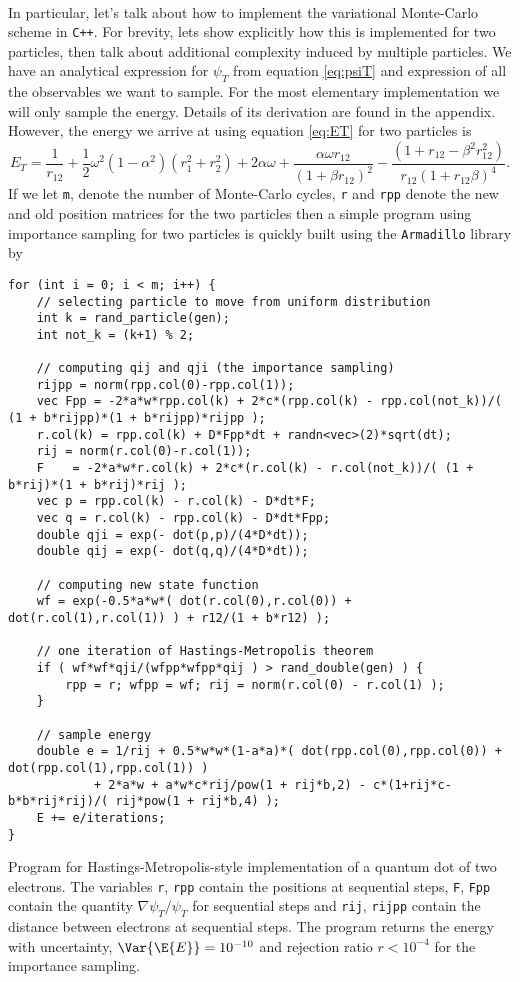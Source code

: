 \documentclass[11pt,english,a4paper]{article}
\begin{document}
\\
In particular, let's talk about how to implement the variational Monte-Carlo scheme in \texttt{C++}. For brevity, lets show explicitly how this is implemented for two particles, then talk about additional complexity induced by multiple particles. We have an analytical expression for $\psi_T$ from equation \eqref{eq:psiT} and expression of all the observables we want to sample. For the most elementary implementation we will only sample the energy. Details of its derivation are found in the appendix. However, the energy we arrive at using equation \eqref{eq:ET} for two particles is
\[
E_T = \frac{1}{r_{12}} + \frac{1}{2}\omega^2(1-\alpha^2)( r_1^2 + r_2^2 )
            + 2\alpha\omega + \frac{\alpha\omega r_{12}}{(1 + \beta r_{12})^2} - \frac{(1+r_{12}-\beta^2r_{12}^2)}{ r_{12}(1 + r_{12}\beta)^4 }.
\]
If we let \texttt{m}, denote the number of Monte-Carlo cycles, \texttt{r} and \texttt{rpp} denote the new and old position matrices for the two particles then a simple program using importance sampling for two particles is quickly built using the \texttt{Armadillo} library by\\
\begin{table}
\begin{lstlisting}
for (int i = 0; i < m; i++) {
    // selecting particle to move from uniform distribution
    int k = rand_particle(gen);
    int not_k = (k+1) % 2;
    
    // computing qij and qji (the importance sampling)
    rijpp = norm(rpp.col(0)-rpp.col(1));
    vec Fpp = -2*a*w*rpp.col(k) + 2*c*(rpp.col(k) - rpp.col(not_k))/( (1 + b*rijpp)*(1 + b*rijpp)*rijpp );
    r.col(k) = rpp.col(k) + D*Fpp*dt + randn<vec>(2)*sqrt(dt);
    rij = norm(r.col(0)-r.col(1));
    F    = -2*a*w*r.col(k) + 2*c*(r.col(k) - r.col(not_k))/( (1 + b*rij)*(1 + b*rij)*rij );
    vec p = rpp.col(k) - r.col(k) - D*dt*F; 
    vec q = r.col(k) - rpp.col(k) - D*dt*Fpp;
    double qji = exp(- dot(p,p)/(4*D*dt)); 
    double qij = exp(- dot(q,q)/(4*D*dt));
    
    // computing new state function
    wf = exp(-0.5*a*w*( dot(r.col(0),r.col(0)) + dot(r.col(1),r.col(1)) ) + r12/(1 + b*r12) );
	
    // one iteration of Hastings-Metropolis theorem
    if ( wf*wf*qji/(wfpp*wfpp*qij ) > rand_double(gen) ) {
        rpp = r; wfpp = wf; rij = norm(r.col(0) - r.col(1) );
    }
    
    // sample energy
    double e = 1/rij + 0.5*w*w*(1-a*a)*( dot(rpp.col(0),rpp.col(0)) + dot(rpp.col(1),rpp.col(1)) )
            + 2*a*w + a*w*c*rij/pow(1 + rij*b,2) - c*(1+rij*c-b*b*rij*rij)/( rij*pow(1 + rij*b,4) );
    E += e/iterations;
}
\end{lstlisting}
\caption{Program for Hastings-Metropolis-style implementation of a quantum dot of two electrons. The variables \texttt{r}, \texttt{rpp} contain the positions at sequential steps, \texttt{F}, \texttt{Fpp} contain the quantity $\nabla \psi_T/\psi_T$ for sequential steps and \texttt{rij}, \texttt{rijpp} contain the distance between electrons at sequential steps. The program returns the energy with uncertainty, $\Var{\E{E}} = 10^{-10}$ and rejection ratio $r < 10^{-4}$ for the importance sampling.}
\end{table}
\end{document}
